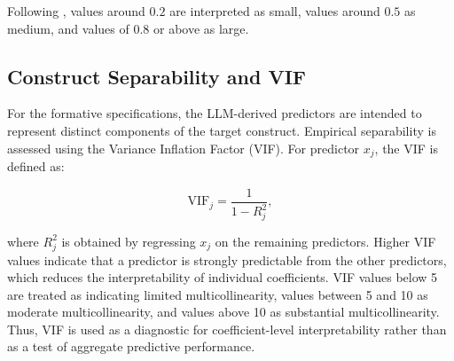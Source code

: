 Following \citet{cohen1988statistical}, values around $0.2$ are interpreted as small, values around $0.5$ as medium, and values of $0.8$ or above as large.


\subsection{Construct Separability and VIF}
\label{app:vif_diagnostics_prose}

For the formative specifications, the LLM-derived predictors are intended to represent distinct components of the target construct. Empirical separability is assessed using the Variance Inflation Factor (VIF). For predictor $x_j$, the VIF is defined as:

\[
\mathrm{VIF}_j = \frac{1}{1 - R_j^2},
\]

where $R_j^2$ is obtained by regressing $x_j$ on the remaining predictors. Higher VIF values indicate that a predictor is strongly predictable from the other predictors, which reduces the interpretability of individual coefficients. VIF values below 5 are treated as indicating limited multicollinearity, values between 5 and 10 as moderate multicollinearity, and values above 10 as substantial multicollinearity. Thus, VIF is used as a diagnostic for coefficient-level interpretability rather than as a test of aggregate predictive performance.
